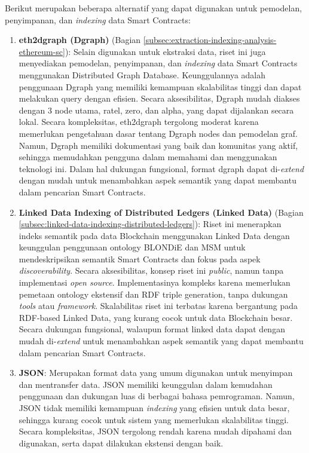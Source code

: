 Berikut merupakan beberapa alternatif yang dapat digunakan untuk pemodelan, penyimpanan, dan \textit{indexing} data Smart Contracts:
\begin{enumerate}
	\item \textbf{eth2dgraph (Dgraph)} \parencite{aimar2023extraction} (Bagian \ref{subsec:extraction-indexing-analysis-ethereum-sc}): Selain digunakan untuk ekstraksi data, riset ini juga menyediakan pemodelan, penyimpanan, dan \textit{indexing} data Smart Contracts menggunakan Distributed Graph Database. Keunggulannya adalah penggunaan Dgraph yang memiliki kemampuan skalabilitas tinggi dan dapat melakukan query dengan efisien. Secara aksesibilitas, Dgraph mudah diakses dengan 3 node utama, ratel, zero, dan alpha, yang dapat dijalankan secara lokal. Secara kompleksitas, eth2dgraph tergolong moderat karena memerlukan pengetahuan dasar tentang Dgraph nodes dan pemodelan graf. Namun, Dgraph memiliki dokumentasi yang baik dan komunitas yang aktif, sehingga memudahkan pengguna dalam memahami dan menggunakan teknologi ini. Dalam hal dukungan fungsional, format dgraph dapat di-\textit{extend} dengan mudah untuk menambahkan aspek semantik yang dapat membantu dalam pencarian Smart Contracts.

	\item \textbf{Linked Data Indexing of Distributed Ledgers (Linked Data)} \parencite{third2017linked} (Bagian \ref{subsec:linked-data-indexing-distributed-ledgers}): Riset ini menerapkan indeks semantik pada data Blockchain menggunakan Linked Data dengan keunggulan penggunaan ontology BLONDiE dan MSM untuk mendeskripsikan semantik Smart Contracts dan fokus pada aspek \textit{discoverability}. Secara aksesibilitas, konsep riset ini \textit{public}, namun tanpa implementasi \textit{open source}. Implementasinya kompleks karena memerlukan pemetaan ontology ekstensif dan RDF triple generation, tanpa dukungan \textit{tools} atau \textit{framework}. Skalabilitas riset ini terbatas karena bergantung pada RDF-based Linked Data, yang kurang cocok untuk data Blockchain besar. Secara dukungan fungsional, walaupun format linked data dapat dengan mudah di-\textit{extend} untuk menambahkan aspek semantik yang dapat membantu dalam pencarian Smart Contracts.

	\item \textbf{JSON}: Merupakan format data yang umum digunakan untuk menyimpan dan mentransfer data. JSON memiliki keunggulan dalam kemudahan penggunaan dan dukungan luas di berbagai bahasa pemrograman. Namun, JSON tidak memiliki kemampuan \textit{indexing} yang efisien untuk data besar, sehingga kurang cocok untuk sistem yang memerlukan skalabilitas tinggi. Secara kompleksitas, JSON tergolong rendah karena mudah dipahami dan digunakan, serta dapat dilakukan ekstensi dengan baik.


\end{enumerate}
